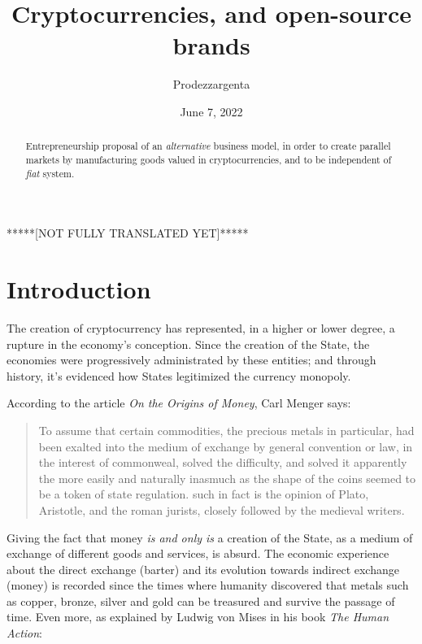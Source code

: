 \documentclass[12pt,a4paper]{article}
\author{Prodezzargenta}
\title{Cryptocurrencies, and open-source brands}
\date{June 7, 2022}
\begin{document}
\maketitle

\begin{center}
*****[NOT FULLY TRANSLATED YET]*****
\end{center}

\begin{abstract}
Entrepreneurship proposal of an \textit{alternative} business model, in order to create parallel markets by manufacturing goods valued in cryptocurrencies, and to be independent of \textit{fiat} system.
\end{abstract}
	
\tableofcontents

\section{Introduction}
The creation of cryptocurrency has represented, in a higher or lower degree, a rupture in the economy's conception. Since the creation of the State, the economies were progressively administrated by these entities; and through history, it's evidenced how States legitimized the currency monopoly.

According to the article \textit{On the Origins of Money}, Carl Menger says:

\begin{quotation}
To assume that certain commodities, the precious metals in particular, had been exalted into the medium of exchange by general convention or law, in the interest of commonweal, solved the difficulty, and solved it apparently the more easily and naturally inasmuch as the shape of the coins seemed to be a token of state regulation. such in fact is the opinion of Plato, Aristotle, and the roman jurists, closely followed by the medieval writers.  \cite[p. 16]{menger:origins}
\end{quotation}

Giving the fact that money \textit{is and only is} a creation of the State, as a medium of exchange of different goods and services, is absurd. The economic experience about the direct exchange (barter) and its evolution towards indirect exchange (money) is recorded since the times where humanity discovered that metals such as copper, bronze, silver and gold can be treasured and survive the passage of time. Even more, as explained by Ludwig von Mises in his book \textit{The Human Action}:
\end{document}
